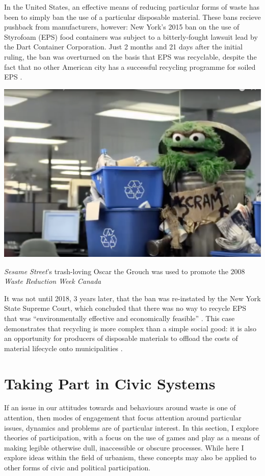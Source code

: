 \documentclass[nofonts,nols,justified,nobib]{tufte-book}
\begin{document}
In the United States, an effective means of reducing particular forms of waste has been to simply ban the use of a particular disposable material. These bans recieve pushback from manufacturers, however: New York's 2015 ban on the use of Styrofoam (EPS) food containers was subject to a bitterly-fought lawsuit lead by the Dart Container Corporation. Just 2 months and 21 days after the initial ruling, the ban was overturned on the basis that EPS was recyclable, despite the fact that no other American city has a successful recycling programme for soiled EPS \cite{liboiron_power_2015}. 
\begin{marginfigure}
\includegraphics[width=\textwidth]{img/1/oscar-recycle.png}
\caption{\emph{Sesame Street}'s trash-loving Oscar the Grouch was used to promote the 2008 \emph{Waste Reduction Week Canada} \cite{darryl_dinn_recycling_2008}}
\end{marginfigure}
It was not until 2018, 3 years later, that the ban was re-instated by the New York State Supreme Court, which concluded that there was no way to recycle EPS that was ``environmentally effective and economically feasible'' \cite{goldstein_court_2018}. This case demonstrates that recycling is more complex than a simple social good: it is also an opportunity for producers of disposable materials to offload the costs of material lifecycle onto municipalities \cite{macbride_recycling_2011}.


\newpage

\section*{Taking Part in Civic Systems}
If an issue in our attitudes towards and behaviours around waste is one of attention, then modes of engagement that focus attention around particular issues, dynamics and problems are of particular interest. In this section, I explore theories of participation, with a focus on the use of games and play as a means of making legible otherwise dull, inaccessible or obscure processes. While here I explore ideas within the field of urbanism, these concepts may also be applied to other forms of civic and political participation.
\end{document}

